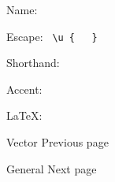 { }

\subsubsection{\texorpdfstring{{ }}{ }}\label{section-1}

Name: \texttt{\ }


Escape: \texttt{\ \textbackslash{}u\ \{\ }{\texttt{\ }}\texttt{\ \}\ }


Shorthand: \texttt{\ }

{ }

Accent:


LaTeX: \texttt{\ }

{ }

\href{/docs/reference/math/vec/}{\pandocbounded{}}

{ Vector } { Previous page }

\href{/docs/reference/symbols/sym/}{\pandocbounded{}}

{ General } { Next page }

